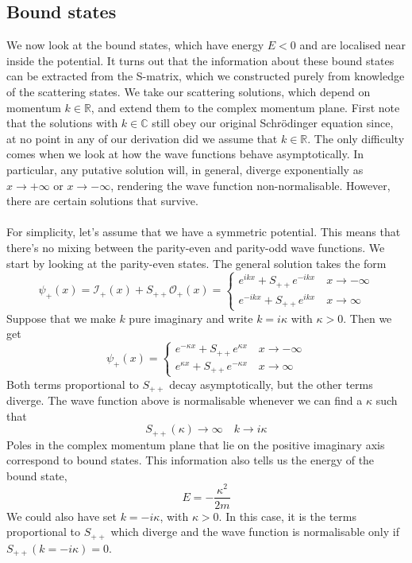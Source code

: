 \subsection{Bound states}
We now look at the bound states, which have energy $E < 0$ and are localised near inside the potential.
It turns out that the information about these bound states can be extracted from the S-matrix, which we constructed purely from knowledge of the scattering states. 
We take our scattering solutions, which depend on momentum $k \in  \mathbb{R}$, and extend them to the complex momentum plane. 
First note that the solutions with $k \in  \mathbb{C}$ still obey our original Schrödinger equation since, at no point in any of our derivation did we assume that $k \in  \mathbb{R}$. 
The only difficulty comes when we look at how the wave functions behave asymptotically.
In particular, any putative solution will, in general, diverge exponentially as $x \to +\infty$ or $x \to -\infty$, rendering the wave function non-normalisable. However, there are certain solutions that survive.
\\ \\
For simplicity, let's assume that we have a symmetric potential. This means that there's no mixing between the parity-even and parity-odd wave functions. We start by looking at the parity-even states. The general solution takes the form
\[\psi_+(x) = \mathcal{I}_+(x) + S_{++}\mathcal{O}_+(x)  = \begin{cases} e^{ikx} + S_{++}e^{-ikx} \quad x\to -\infty \\  e^{-ikx} + S_{++}e^{ikx} \quad x\to \infty \end{cases} \]
Suppose that we make $k$ pure imaginary and write $k = i\kappa$ with $\kappa > 0$. Then we get
\[\psi_+(x) = \begin{cases} e^{-\kappa x} + S_{++}e^{\kappa x} \quad x\to -\infty \\  e^{\kappa x} + S_{++}e^{-\kappa x} \quad x\to \infty \end{cases}\]
Both terms proportional to $S_{++}$ decay asymptotically, but the other terms diverge.
The wave function above is normalisable whenever we can find a $\kappa$ such that
\[S_{++}(\kappa) \to \infty \quad k \to i\kappa\]
Poles in the complex momentum plane that lie on the positive imaginary axis correspond to bound states.
This information also tells us the energy of the bound state,
\[E = -\frac{\kappa^2}{2m}\]
We could also have set $k = -i\kappa$, with $\kappa > 0$. In this case, it is the terms proportional to $S_{++}$ which diverge and the wave function is normalisable only if $S_{++}(k = -i\kappa) = 0$. 

